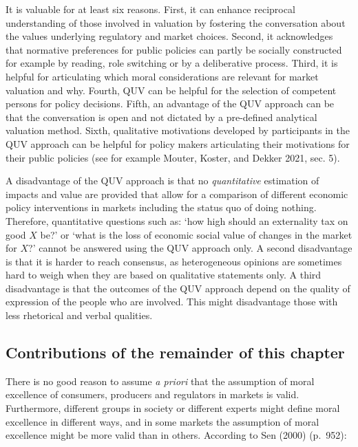 \documentclass[
]{book}
\begin{document}
It is valuable for at least six reasons. First, it can enhance reciprocal understanding of those involved in valuation by fostering the conversation about the values underlying regulatory and market choices. Second, it acknowledges that normative preferences for public policies can partly be socially constructed for example by reading, role switching or by a deliberative process. Third, it is helpful for articulating which moral considerations are relevant for market valuation and why. Fourth, QUV can be helpful for the selection of competent persons for policy decisions. Fifth, an advantage of the QUV approach can be that the conversation is open and not dictated by a pre-defined analytical valuation method. Sixth, qualitative motivations developed by participants in the QUV approach can be helpful for policy makers articulating their motivations for their public policies (see for example Mouter, Koster, and Dekker 2021, sec. 5).

A disadvantage of the QUV approach is that no \emph{quantitative} estimation of impacts and value are provided that allow for a comparison of different economic policy interventions in markets including the status quo of doing nothing. Therefore, quantitative questions such as: `how high should an externality tax on good \(X\) be?' or `what is the loss of economic social value of changes in the market for \(X\)?' cannot be answered using the QUV approach only. A second disadvantage is that it is harder to reach consensus, as heterogeneous opinions are sometimes hard to weigh when they are based on qualitative statements only. A third disadvantage is that the outcomes of the QUV approach depend on the quality of expression of the people who are involved. This might disadvantage those with less rhetorical and verbal qualities.

\hypertarget{contributions-of-the-remainder-of-this-chapter}{%
\subsection{Contributions of the remainder of this chapter}\label{contributions-of-the-remainder-of-this-chapter}}

There is no good reason to assume \emph{a priori} that the assumption of moral excellence of consumers, producers and regulators in markets is valid. Furthermore, different groups in society or different experts might define moral excellence in different ways, and in some markets the assumption of moral excellence might be more valid than in others. According to Sen (2000) (p.~952):
\end{document}

